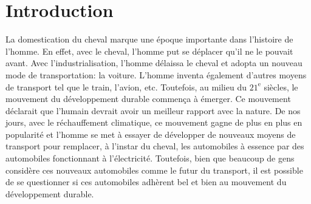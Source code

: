 
\chapter{Introduction}

La domestication du cheval marque une époque importante dans l'histoire de l'homme. En effet, avec le cheval, l'homme put se déplacer qu'il ne le pouvait avant. Avec l'industrialisation, l'homme délaissa le cheval et adopta un nouveau mode de transportation: la voiture. L'homme inventa également d'autres moyens de transport tel que le train, l'avion, etc. Toutefois, au milieu du $21^{\mathrm{e}}$ siècles, le mouvement du développement durable commença à émerger. Ce mouvement déclarait que l'humain devrait avoir un meilleur rapport avec la nature. De nos jours, avec le réchauffement climatique, ce mouvement gagne de plus en plus en popularité et l'homme se met à essayer de développer de nouveaux moyens de transport pour remplacer, à l'instar du cheval, les automobiles à essence par des automobiles fonctionnant à l'électricité. Toutefois, bien que beaucoup de gens considère ces nouveaux automobiles comme le futur du transport, il est possible de se questionner si ces automobiles adhèrent bel et bien au mouvement du développement durable.
